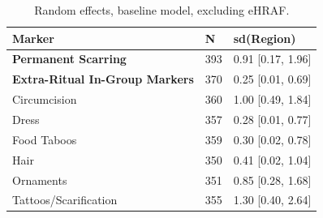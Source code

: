 \begin{table}[!ht]
\centering
\small
\caption{Random effects, baseline model, excluding eHRAF.}
\label{tab:extnoehraf_random_effects_baseline}
\begin{tabular}{lll}
\toprule
Marker & N & sd(Region) \\
\midrule
\textbf{Permanent Scarring} & 393 & 0.91 [0.17, 1.96] \\
\textbf{Extra-Ritual In-Group Markers} & 370 & 0.25 [0.01, 0.69] \\
\midrule
Circumcision & 360 & 1.00 [0.49, 1.84] \\
Dress & 357 & 0.28 [0.01, 0.77] \\
Food Taboos & 359 & 0.30 [0.02, 0.78] \\
Hair & 350 & 0.41 [0.02, 1.04] \\
Ornaments & 351 & 0.85 [0.28, 1.68] \\
Tattoos/Scarification & 355 & 1.30 [0.40, 2.64] \\
\bottomrule
\end{tabular}
\end{table}